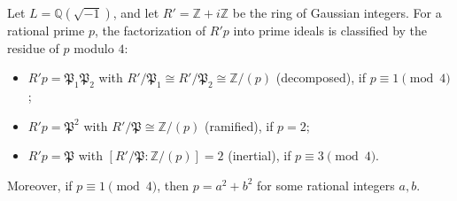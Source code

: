 Let $L = \mathbb{Q}(\sqrt{-1})$, and let $R' = \mathbb{Z} + i\mathbb{Z}$ be the ring of Gaussian integers. For a rational prime $p$, the factorization of $R'p$ into prime ideals is classified by the residue of $p$ modulo $4$:
\begin{itemize}
\item $R'p = \mathfrak{P}_1 \mathfrak{P}_2$ with $R'/\mathfrak{P}_1 \cong R'/\mathfrak{P}_2 \cong \mathbb{Z}/(p)$ (decomposed), if $p \equiv 1 \pmod{4}$;
\item $R'p = \mathfrak{P}^2$ with $R'/\mathfrak{P} \cong \mathbb{Z}/(p)$ (ramified), if $p = 2$;
\item $R'p = \mathfrak{P}$ with $[R'/\mathfrak{P} : \mathbb{Z}/(p)] = 2$ (inertial), if $p \equiv 3 \pmod{4}$.
\end{itemize}
Moreover, if $p \equiv 1 \pmod{4}$, then $p = a^2 + b^2$ for some rational integers $a, b$.
